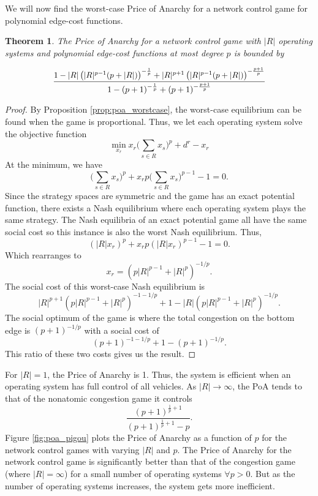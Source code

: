 \documentclass{article}
\newtheorem{theorem}{Theorem}
\begin{document}
    We will now find the worst-case Price of Anarchy for a network control game for polynomial edge-cost functions. 
    \begin{theorem} \label{theorem:poa}
    The Price of Anarchy for a network control game with $|R|$ operating systems and polynomial edge-cost functions at most degree $p$ is bounded by
        
    \[\frac{\mbox{\scalebox{0.95}{$1-|R| \left(|R|^{p-1} (p+|R|)\right)^{-\frac{1}{p}}+|R|^{p+1} \left(|R|^{p-1} (p+|R|)\right)^{-\frac{p+1}{p}}$}}}
     {\mbox{\scalebox{0.98}{$1-(p+1)^{-\frac{1}{p}}+(p+1)^{-\frac{p+1}{p}}$}}}\]
    \end{theorem}
    
    \begin{proof}
    By Proposition \ref{prop:poa_worstcase}, the worst-case equilibrium can be found when the game is proportional. Thus, we let each operating system solve the objective function
        \[ \min_{x_r} x_r \big(\sum_{s \in R} x_s\big)^p + d^r - x_r \]
    At the minimum, we have
        \[ \big(\sum_{s \in R} x_s\big)^p + x_r p\big(\sum_{s \in R} x_s\big)^{p-1} - 1 = 0.\]
    Since the strategy spaces are symmetric and the game has an exact potential function, there exists a Nash equilibrium where each operating system plays the same strategy. The Nash equilibria of an exact potential game all have the same social cost so this instance is also the worst Nash equilibrium. Thus, 
        \[ (|R|x_r)^p + x_r p(|R|x_r)^{p-1} - 1 = 0.\]
    Which rearranges to
        \[  x_r =  (p|R|^{p-1}+|R|^p)^{-1/p} . \] 
    The social cost of this worst-case Nash equilibrium is
        \[ |R|^{p+1}(p|R|^{p-1}+|R|^p)^{-1-1/p}+1-|R|(p|R|^{p-1}+|R|^p)^{-1/p}.  \]
    The social optimum of the game is where the total congestion on the bottom edge is $(p+1)^{-1/p}$ with a social cost of \[(p+1)^{-1-1/p}+1-(p+1)^{-1/p}.\] 
    This ratio of these two costs gives us the result.
    \end{proof}
    
    For $|R|=1$, the Price of Anarchy is 1. Thus, the system is efficient when an operating system has full control of all vehicles. As $|R|\rightarrow \infty$, the PoA tends to that of the nonatomic congestion game it controls \cite{Roughgarden2003} 
    \[ \frac{(p+1)^{\frac{1}{p}+1}}{(p+1)^{\frac{1}{p}+1}-p}.    \]
    Figure \ref{fig:poa_pigou} plots the Price of Anarchy as a function of $p$ for the network control games with varying $|R|$ and $p$.
    The Price of Anarchy for the network control game is significantly better than that of the congestion game (where $|R|=\infty$) for a small number of operating systems $\forall p>0$. But as the number of operating systems increases, the system gets more inefficient. 
    
\end{document}
